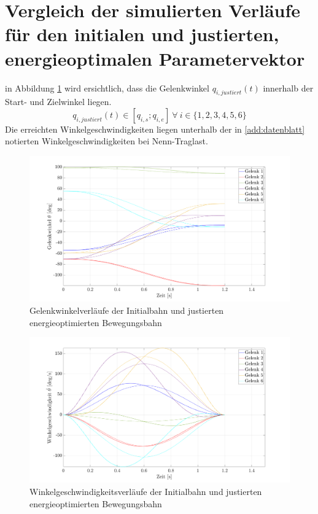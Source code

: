 \section{Vergleich der simulierten Verläufe für den initialen und justierten, energieoptimalen Parametervektor}
\label{acc:optupjust}
%
in Abbildung \ref{fig:posoptfinal} wird ersichtlich, dass die Gelenkwinkel $q_{i,justiert}(t)$ innerhalb der Start- und Zielwinkel liegen.
%
\begin{equation}
	q_{i,justiert}(t) \in [q_{i,s};q_{i,e}] ~\forall~ i \in \{1,2,3,4,5,6\}
\end{equation}
%
Die erreichten Winkelgeschwindigkeiten liegen unterhalb der in \ref{add:datenblatt} notierten Winkelgeschwindigkeiten bei Nenn-Traglast.
%
\begin{figure}[tbph]
	\centering
	\includegraphics[width=1\linewidth]{images/Optimierungsergebnisse_up/posoptfinal}
	\caption{Gelenkwinkelverläufe der Initialbahn und justierten energieoptimierten Bewegungsbahn}
	\label{fig:posoptfinal}
\end{figure}
%
\begin{figure}[tbph]
	\centering
	\includegraphics[width=1\linewidth]{images/Optimierungsergebnisse_up/veloptfinal}
	\caption{Winkelgeschwindigkeitsverläufe der Initialbahn und justierten energieoptimierten Bewegungsbahn}
	\label{fig:veloptfinal}
\end{figure}
